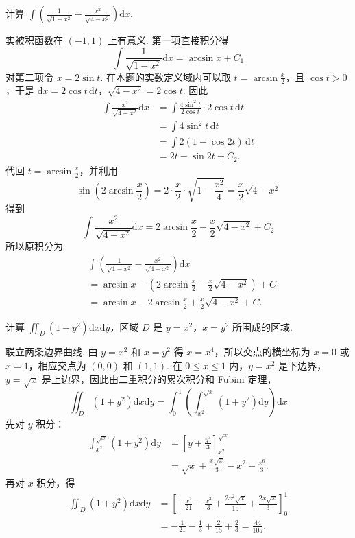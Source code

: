 \begin{problem}
计算 \(\int\left(\frac{1}{\sqrt{1-x^2}}-\frac{x^2}{\sqrt{4-x^2}}\right)\mathrm{d}x\).
\end{problem}

\begin{solution}
实被积函数在 \((-1,1)\) 上有意义. 第一项直接积分得
\[
\int\frac{1}{\sqrt{1-x^2}}\mathrm{d}x=\arcsin x+C_1
\]
对第二项令 \(x=2\sin t\). 在本题的实数定义域内可以取 \(t=\arcsin\frac{x}{2}\)，且 \(\cos t>0\)，于是
\(\mathrm{d}x=2\cos t\,\mathrm{d}t\)，\(\sqrt{4-x^2}=2\cos t\).
因此
\[
\begin{aligned}
\int\frac{x^2}{\sqrt{4-x^2}}\mathrm{d}x
&=\int\frac{4\sin^2t}{2\cos t}\cdot2\cos t\,\mathrm{d}t\\
&=\int4\sin^2t\,\mathrm{d}t\\
&=\int2\left(1-\cos2t\right)\,\mathrm{d}t\\
&=2t-\sin2t+C_2.
\end{aligned}
\]
代回 \(t=\arcsin\frac{x}{2}\)，并利用
\[
\sin\left(2\arcsin\frac{x}{2}\right)
=2\cdot\frac{x}{2}\cdot\sqrt{1-\frac{x^2}{4}}
=\frac{x}{2}\sqrt{4-x^2}
\]
得到
\[
\int\frac{x^2}{\sqrt{4-x^2}}\mathrm{d}x
=2\arcsin\frac{x}{2}-\frac{x}{2}\sqrt{4-x^2}+C_2
\]
所以原积分为
\[
\begin{aligned}
&\int\left(\frac{1}{\sqrt{1-x^2}}-\frac{x^2}{\sqrt{4-x^2}}\right)\mathrm{d}x\\
&=\arcsin x-\left(2\arcsin\frac{x}{2}-\frac{x}{2}\sqrt{4-x^2}\right)+C\\
&=\arcsin x-2\arcsin\frac{x}{2}+\frac{x}{2}\sqrt{4-x^2}+C.
\end{aligned}
\]
\end{solution}

\begin{problem}
计算 \(\iint_D\left(1+y^2\right)\mathrm{d}x\mathrm{d}y\)，区域 \(D\) 是 \(y=x^2\)，\(x=y^2\) 所围成的区域.
\end{problem}

\begin{solution}
联立两条边界曲线. 由 \(y=x^2\) 和 \(x=y^2\) 得 \(x=x^4\)，所以交点的横坐标为 \(x=0\) 或 \(x=1\)，相应交点为 \((0,0)\) 和 \((1,1)\). 在 \(0\leqslant x\leqslant1\) 内，\(y=x^2\) 是下边界，\(y=\sqrt{x}\) 是上边界，因此由二重积分的累次积分和 Fubini 定理，
\[
\iint_D\left(1+y^2\right)\mathrm{d}x\mathrm{d}y
=\int_0^1\left(\int_{x^2}^{\sqrt{x}}\left(1+y^2\right)\mathrm{d}y\right)\mathrm{d}x
\]
先对 \(y\) 积分：
\[
\begin{aligned}
\int_{x^2}^{\sqrt{x}}\left(1+y^2\right)\mathrm{d}y
&=\left[y+\frac{y^3}{3}\right]_{x^2}^{\sqrt{x}}\\
&=\sqrt{x}+\frac{x\sqrt{x}}{3}-x^2-\frac{x^6}{3}.
\end{aligned}
\]
再对 \(x\) 积分，得
\[
\begin{aligned}
\iint_D\left(1+y^2\right)\mathrm{d}x\mathrm{d}y
&=\left[-\frac{x^7}{21}-\frac{x^3}{3}+\frac{2x^2\sqrt{x}}{15}+\frac{2x\sqrt{x}}{3}\right]_0^1\\
&=-\frac1{21}-\frac13+\frac2{15}+\frac23=\frac{44}{105}.
\end{aligned}
\]
\end{solution}

